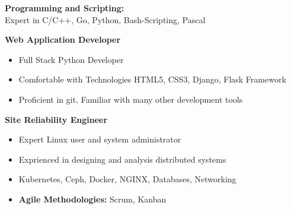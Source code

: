 \documentclass[margin]{res}
\begin{document}
\begin{resume}
	{\bf Programming and Scripting:}
	\\Expert in C/C++, Go, Python, Bash-Scripting, Pascal
	
	{\bf Web Application Developer}
	\begin{itemize}
		\item Full Stack Python Developer
		\item Comfortable with Technologies HTML5, CSS3, Django, Flask Framework
		\item Proficient in git, Familiar with many other development tools
	\end{itemize}
	
	{\bf Site Reliability Engineer}
	\begin{itemize}
		\item Expert Linux user and system administrator
		\item Exprienced in designing and analysis distributed systems
		\item Kubernetes, Ceph, Docker, NGINX, Databases, Networking
	\end{itemize}
	
	\vspace{3mm}

	\begin{itemize}[leftmargin=0mm]
	    \item[] \textbf{Agile Methodologies:} Scrum, Kanban
	\end{itemize}

\end{resume}
\end{document}
